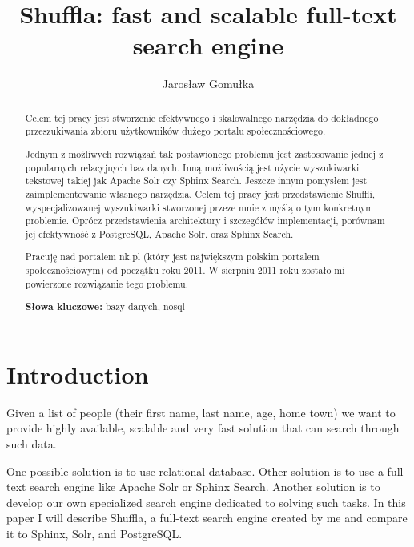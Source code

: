 \documentclass[10pt,a4paper]{article}
\begin{document}
\normalsize

\restoregeometry

\newpage
\thispagestyle{empty}

\begin{abstract}
Celem tej pracy jest stworzenie efektywnego i skalowalnego narzędzia do dokładnego przeszukiwania zbioru użytkowników dużego portalu społecznościowego. 

Jednym z możliwych rozwiązań tak postawionego problemu jest zastosowanie jednej z popularnych relacyjnych baz danych. Inną możliwością jest użycie wyszukiwarki tekstowej takiej jak Apache Solr czy Sphinx Search. Jeszcze innym pomysłem jest zaimplementowanie własnego narzędzia. Celem tej pracy jest przedstawienie Shuffli, wyspecjalizowanej wyszukiwarki stworzonej przeze mnie z myślą o tym konkretnym problemie. Oprócz przedstawienia architektury i szczegółów implementacji, porównam jej efektywność z PostgreSQL, Apache Solr, oraz Sphinx Search.

\bigskip
Pracuję nad portalem nk.pl (który jest największym polskim portalem społecznościowym) od początku roku 2011. W sierpniu 2011 roku zostało mi powierzone rozwiązanie tego problemu.

\bigskip
\noindent \textbf{Słowa kluczowe:} bazy danych, nosql
\end{abstract}



\title{Shuffla: fast and scalable full-text search engine}
\author{Jarosław Gomułka}

\maketitle


\section{Introduction}

Given a list of people (their first name, last name, age, home town) we want to provide highly available, scalable and very fast solution that can search through such data.

One possible solution is to use relational database. Other solution is to use a full-text search engine like Apache Solr or Sphinx Search. Another solution is to develop our own specialized search engine dedicated to solving such tasks. In this paper I will describe Shuffla, a full-text search engine created by me and compare it to Sphinx, Solr, and PostgreSQL. 
\end{document}
